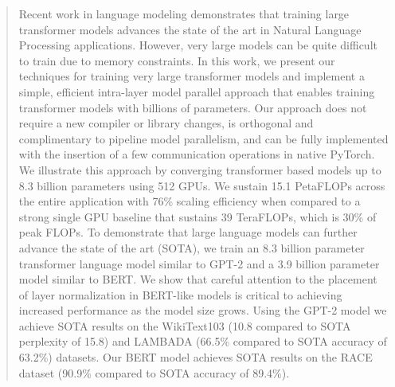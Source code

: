 \documentclass{article}
\begin{document}

\printAffiliationsAndNotice{}

\begin{abstract}

Recent work in language modeling demonstrates that training large transformer models advances the state of the art in Natural Language Processing applications. However, very large models can be quite difficult to train due to memory constraints. In this work, we present our techniques for training very large transformer models and implement a simple, efficient intra-layer model parallel approach that enables training transformer models with billions of parameters. Our approach does not require a new compiler or library changes, is orthogonal and complimentary to pipeline model parallelism, and can be fully implemented with the insertion of a few communication operations in native PyTorch. We illustrate this approach by converging transformer based models up to 8.3 billion parameters using 512 GPUs. We sustain 15.1 PetaFLOPs  across the entire application with 76\% scaling efficiency when compared to a strong single GPU baseline that sustains 39 TeraFLOPs, which is 30\% of peak FLOPs. To demonstrate that large language models can further advance the state of the art (SOTA), we train an 8.3 billion parameter transformer language model similar to GPT-2 and a 3.9 billion parameter model similar to BERT. We show that careful attention to the placement of layer normalization in BERT-like models is critical to achieving increased performance as the model size grows. Using the GPT-2 model we achieve SOTA results on the WikiText103 (10.8 compared to SOTA perplexity of 15.8) and LAMBADA (66.5\% compared to SOTA accuracy of 63.2\%) datasets. Our BERT model achieves SOTA results on the RACE dataset (90.9\% compared to SOTA accuracy of 89.4\%).
  
\end{abstract}
\end{document}
